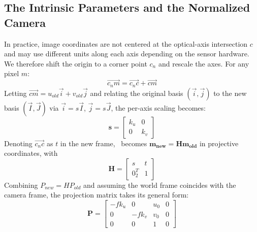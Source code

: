 \subsection{The Intrinsic Parameters and the Normalized Camera}
In practice, image coordinates are not centered at the optical-axis intersection $c$ and may use different units along each axis depending on the sensor hardware. We therefore shift the origin to a corner point $c_n$ and rescale the axes. For any pixel $m$:
\begin{equation}
\overrightarrow{c_n m} = \overrightarrow{c_n c} + \overrightarrow{cm}
\label{eq:2.1.2/vector_sum}
\end{equation}
Letting $\overrightarrow{cm} = u_{old}\vec{i} + v_{old}\vec{j}$ and relating the original basis $(\vec{i}, \vec{j})$ to the new basis $(\vec{I}, \vec{J})$ via $\vec{i} = s\vec{I}$, $\vec{j} = s\vec{J}$, the per-axis scaling becomes:
\begin{equation}
\mathbf{s} = \begin{bmatrix}
k_u & 0 \\
0 & k_v
\end{bmatrix}
\label{eq:2.1.2/scaling_s}
\end{equation}
Denoting $\overrightarrow{c_n c}$ as $t$ in the new frame,~ becomes $\mathbf{m_{new}} = \mathbf{H}\mathbf{m_{old}}$ in projective coordinates, with
\begin{equation}
\mathbf{H} = \begin{bmatrix}
s & t \\
0^T_2 & 1
\end{bmatrix}
\label{eq:2.1.2/matrix_h}
\end{equation}
Combining $P_{new} = H P_{old}$ and assuming the world frame coincides with the camera frame, the projection matrix takes its general form:
\begin{equation}
\mathbf{P} = \begin{bmatrix}
-f k_u & 0 & u_0 & 0 \\
0 & -f k_v & v_0 & 0 \\
0 & 0 & 1 & 0
\end{bmatrix}
\label{eq:2.1.2/matrix_p_general}
\end{equation}
